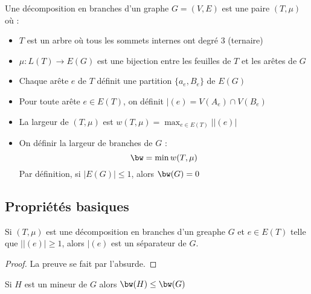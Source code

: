 \documentclass[a4paper, 11pt]{thesis}
\begin{document}
\begin{df}
    Une décomposition en branches d'un graphe $G=(V,E)$ est une paire $(T, \mu)$ où :
    \begin{itemize}
        \item $T$ est un arbre où tous les sommets internes ont degré $3$ (ternaire)
        \item $\mu : L(T) \rightarrow E(G)$ est une bijection entre les feuilles de $T$ et les
            arêtes de $G$
    \end{itemize}
\end{df}

\begin{ex}
    \begin{itemize}
        \item Chaque arête $e$ de $T$ définit une partition $\{a_e, B_e\}$ de $E(G)$
        \item Pour toute arête $e \in E(T)$, on définit $\mid(e) = V(A_e) \cap V(B_e)$
        \item La largeur de $(T, \mu)$ est $w(T, \mu) = \max_{e \in E(T)} |\mid(e)|$
        \item On définir la largeur de branches de $G$ : 
            \begin{displaymath}
                \bw = \min w(T, \mu)
            \end{displaymath}
            Par définition, si $|E(G)| \leq 1$, alors $\bw(G) = 0$
    \end{itemize}
\end{ex}

\subsection{Propriétés basiques}

\begin{prop}
    Si $(T, \mu)$ est une décomposition en branches d'un greaphe $G$ et $e \in E(T)$ telle que
    $|\mid(e)| \geq 1$, alors $\mid(e)$ est un séparateur de $G$.
\end{prop}

\begin{proof}
    La preuve se fait par l'absurde.
\end{proof}

\begin{prop}
    Si $H$ est un mineur de $G$ alors $\bw(H) \leq \bw(G)$
\end{prop}

\begin{ex}
\end{ex}
\end{document}

